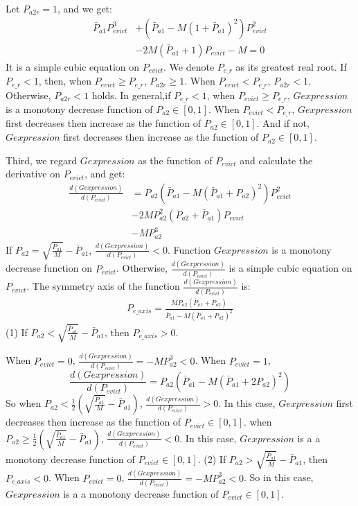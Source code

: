 \begin{enumerate}
Let $P_{a2r} = 1$, and we get:
\begin{equation}
\begin{split}
\bar{P}_{a1}P_{evict}^3& + (\bar{P}_{a1}-M(1+\bar{P}_{a1})^2)P_{evict}^2\\
& - 2M(\bar{P}_{a1}+1)P_{evict}-M = 0
\end{split}
\end{equation}
It is a simple cubic equation on $P_{evict}$. We denote $P_{e\_r}$ as its greatest real root.
If $P_{e\_r} < 1$,
then, when $P_{evict} \geq P_{e\_r}$, $P_{a2r} \geq 1$. When $P_{evict} < P_{e\_r}$, $P_{a2r} < 1$.
Otherwise, $P_{a2r} < 1$ holds.
In general,if $P_{e\_r} < 1$, when $P_{evict} \geq P_{e\_r}$, $Gexpression$ is a monotony decrease function of $P_{a2} \in [0,1]$.
 When $P_{evict} < P_{e\_r}$, $Gexpression$ first decreases then increase as the function of $P_{a2} \in [0,1]$.
 And if not, $Gexpression$ first decreases then increase as the function of $P_{a2} \in [0,1]$.

 Third, we regard $Gexpression$ as the function of $P_{evict}$ and calculate the derivative on $P_{evict}$, and get:
\begin{equation}
\begin{split}
\frac{d(Gexpression)}{d(P_{evict})} &= P_{a2}(\bar{P}_{a1}-M(\bar{P}_{a1}+P_{a2})^2)P_{evict}^2\\
&-2MP_{a2}^{2}(P_{a2}+\bar{P}_{a1})P_{evict}\\
&-MP_{a2}^3
\end{split}
\end{equation}
If $P_{a2}=\sqrt{\frac{\bar{P}_{a1}}{M}}-\bar{P}_{a1}$, $\frac{d(Gexpression)}{d(P_{evict})} < 0$. Function $Gexpression$ is a monotony decrease function on $P_{evict}$.
Otherwise, $\frac{d(Gexpression)}{d(P_{evict})}$ is a simple cubic equation on $P_{evict}$.
The symmetry axis of the function $\frac{d(Gexpression)}{d(P_{evict})}$ is:
\begin{equation}
\begin{split}
P_{e\_axis}=\frac{MP_{a2}(\bar{P}_{a1}+P_{a2})}{\bar{P}_{a1}-M(\bar{P}_{a1}+P_{a2})^2}
\end{split}
\end{equation}
(1) If $P_{a2}< \sqrt{\frac{\bar{P}_{a1}}{M}}-\bar{P}_{a1}$,
 then $P_{e\_axis} > 0$.

 When $P_{evict} = 0$, $\frac{d(Gexpression)}{d(P_{evict})} = -MP_{a2}^3 < 0$.
 When $P_{evict} = 1$,
 $$
 \frac{d(Gexpression)}{d(P_{evict})} = P_{a2}(\bar{P}_{a1}-M(\bar{P}_{a1}+2P_{a2})^2)
 $$
So when $P_{a2}< \frac{1}{2}(\sqrt{\frac{\bar{P}_{a1}}{M}}-\bar{P}_{a1})$, $\frac{d(Gexpression)}{d(P_{evict})} > 0$.
 In this case, $Gexpression$ first decreases then increase as the function of $P_{evict} \in [0,1]$.
when $P_{a2}\geq \frac{1}{2}(\sqrt{\frac{\bar{P}_{a1}}{M}}-\bar{P}_{a1})$, $\frac{d(Gexpression)}{d(P_{evict})} < 0$.
 In this case, $Gexpression$ is a  a monotony decrease function of $P_{evict} \in [0,1]$.
(2) If $P_{a2}> \sqrt{\frac{\bar{P}_{a1}}{M}}-\bar{P}_{a1}$,
then $P_{e\_axis} < 0$.
 When $P_{evict} = 0$, $\frac{d(Gexpression)}{d(P_{evict})} = -MP_{a2}^3 < 0$.
So in this case, $Gexpression$ is a  a monotony decrease function of $P_{evict} \in [0,1]$.


\end{enumerate}
